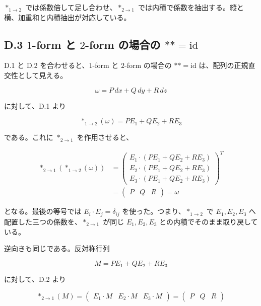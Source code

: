 \documentclass[a4paper,12pt,openany]{book}
\begin{document}
\(\ast_{1\to2}\) では係数倍して足し合わせ、\(\ast_{2\to1}\)
では内積で係数を抽出する。縦と横、加重和と内積抽出が対応している。

\hypertarget{d.3-1-form-ux3068-2-form-ux306eux5834ux5408ux306e-astastmathrmid}{%
\subsection*{\texorpdfstring{D.3 \(1\)-form と \(2\)-form の場合の
\(\ast\ast=\mathrm{id}\)}{D.3 1-form と 2-form の場合の \textbackslash ast\textbackslash ast=\textbackslash mathrm\{id\}}}\label{d.3-1-form-ux3068-2-form-ux306eux5834ux5408ux306e-astastmathrmid}}

D.1 と D.2 を合わせると、\(1\)-form と \(2\)-form の場合の
\(\ast\ast=\mathrm{id}\) は、配列の正規直交性として見える。

\[
\omega=P\,dx+Q\,dy+R\,dz
\]

に対して、D.1 より

\[
\ast_{1\to2}(\omega)=P E_1+Q E_2+R E_3
\]

である。これに \(\ast_{2\to1}\) を作用させると、

\[
\begin{aligned}
\ast_{2\to1}(\ast_{1\to2}(\omega))
&=
\begin{pmatrix}
E_1\cdot (P E_1+Q E_2+R E_3) \\
E_2\cdot (P E_1+Q E_2+R E_3) \\
E_3\cdot (P E_1+Q E_2+R E_3)
\end{pmatrix}^{T} \\
&=
\begin{pmatrix}
P & Q & R
\end{pmatrix}
=
\omega
\end{aligned}
\]

となる。最後の等号では \(E_i\cdot E_j=\delta_{ij}\)
を使った。つまり、\(\ast_{1\to2}\) で \(E_1,E_2,E_3\)
へ配置した三つの係数を、\(\ast_{2\to1}\) が同じ \(E_1,E_2,E_3\)
との内積でそのまま取り戻している。

逆向きも同じである。反対称行列

\[
M=P E_1+Q E_2+R E_3
\]

に対して、D.2 より

\[
\ast_{2\to1}(M)
=
\begin{pmatrix}
E_1\cdot M & E_2\cdot M & E_3\cdot M
\end{pmatrix}
=
\begin{pmatrix}
P & Q & R
\end{pmatrix}
\]
\end{document}
